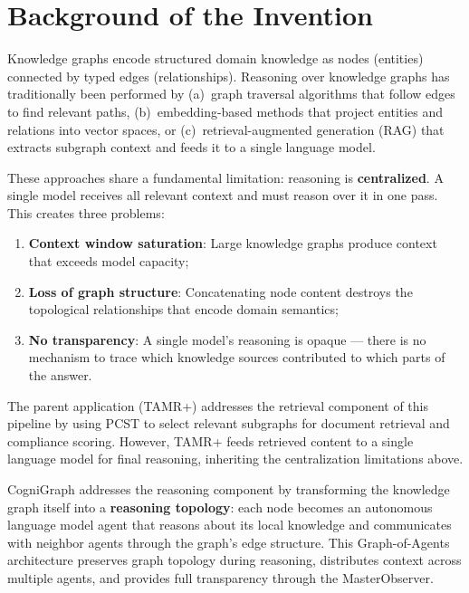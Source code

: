 \documentclass[a4paper,12pt]{article}
\begin{document}
\section*{Background of the Invention}

\noindent Knowledge graphs encode structured domain knowledge as nodes (entities) connected by typed edges (relationships). Reasoning over knowledge graphs has traditionally been performed by (a)~graph traversal algorithms that follow edges to find relevant paths, (b)~embedding-based methods that project entities and relations into vector spaces, or (c)~retrieval-augmented generation (RAG) that extracts subgraph context and feeds it to a single language model.

\vspace{2mm}

\noindent These approaches share a fundamental limitation: reasoning is \textbf{centralized}. A single model receives all relevant context and must reason over it in one pass. This creates three problems:

\begin{enumerate}[nosep,leftmargin=2em]
\item \textbf{Context window saturation}: Large knowledge graphs produce context that exceeds model capacity;
\item \textbf{Loss of graph structure}: Concatenating node content destroys the topological relationships that encode domain semantics;
\item \textbf{No transparency}: A single model's reasoning is opaque --- there is no mechanism to trace which knowledge sources contributed to which parts of the answer.
\end{enumerate}

\vspace{2mm}

\noindent The parent application (TAMR+) addresses the retrieval component of this pipeline by using PCST to select relevant subgraphs for document retrieval and compliance scoring. However, TAMR+ feeds retrieved content to a single language model for final reasoning, inheriting the centralization limitations above.

\vspace{2mm}

\noindent CogniGraph addresses the reasoning component by transforming the knowledge graph itself into a \textbf{reasoning topology}: each node becomes an autonomous language model agent that reasons about its local knowledge and communicates with neighbor agents through the graph's edge structure. This Graph-of-Agents architecture preserves graph topology during reasoning, distributes context across multiple agents, and provides full transparency through the MasterObserver.
\end{document}
